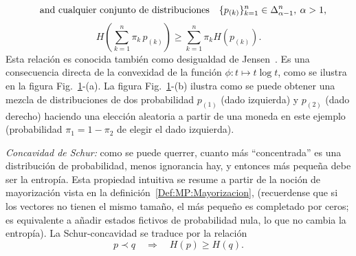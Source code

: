 \begin{propiedades}
\[  \quad \mbox{and  cualquier  conjunto de  distribuciones} \quad  \{
  p_{(k)} \}_{k=1}^n \in \Delta_{\alpha-1}^n, \: \alpha > 1,
  \]
  \[
  H\left( \sum_{k=1}^n \pi_k \, p_{(k)} \right) \ge \sum_{k=1}^n \pi_k H(p_{(k)}).
  \]
  Esta relaci\'on es conocida tambi\'en como desigualdad de Jensen~\cite{Jen06}.
  Es una consecuencia directa de la  convexidad de la funci\'on $\phi: t \mapsto
  t \log  t$, como se ilustra en la  figura Fig.~\ref{Fig:SZ:Concavidad}-(a).  La
  figura  Fig.~\ref{Fig:SZ:Concavidad}-(b)  ilustra como  se  puede obtener  una
  mezcla  de distribuciones  de dos  probabilidad $p_{(1)}$  (dado  izquierda) y
  $p_{(2)}$ (dado  derecho) haciendo  una elecci\'on aleatoria  a partir  de una
  moneda en  este ejemplo (probabilidad  $\pi_1 = 1  - \pi_2$ de elegir  el dado
  izquierda).\newline
  \begin{figure}[h!]
  \begin{center}  \end{center}
  \label{Fig:SZ:Concavidad}
  \end{figure}
%
\setcounter{PropSchurConcavidad}{\value{enumi}}
\item\label{Prop:SZ:Schurconcavidad}  {\it Concavidad de Schur:}  como se  puede
  querrer, cuanto  m\'as ``concentrada'' es una  distribuci\'on de probabilidad,
  menos ignorancia hay, y entonces m\'as peque\~na debe ser la entrop\'ia.  Esta
  propiedad intuitiva se resume a partir  de la noci\'on de mayorizaci\'on vista
  en la definici\'on~\ref{Def:MP:Mayorizacion},
  (recuerdense  que si  los  vectores  no tienen  el  mismo  tama\~no, el  m\'as
  peque\~no es completado por ceros;  es equivalente a a\~nadir estados fictivos
  de probabilidad nula, lo que no cambia la entrop\'ia).
  La  Schur-concavidad  se  traduce  por  la  relaci\'on
  \[
  p \prec  q \quad \Rightarrow  \quad H(p) \ge  H(q).
  \]

\end{propiedades}
